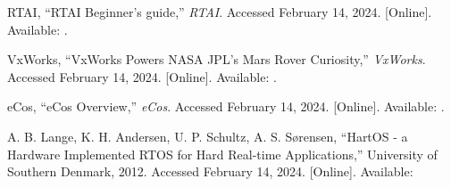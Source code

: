 \begin{thebibliography}{99}
        RTAI,
        ``RTAI Beginner's guide,''
        \textit{RTAI}.
        Accessed February 14, 2024.
        [Online].
        Available: .

        VxWorks,
        ``VxWorks Powers NASA JPL's Mars Rover Curiosity,''
        \textit{VxWorks}.
        Accessed February 14, 2024.
        [Online].
        Available: .

        eCos,
        ``eCos Overview,''
        \textit{eCos}.
        Accessed February 14, 2024.
        [Online].
        Available: .

        A. B. Lange, K. H. Andersen, U. P. Schultz, A. S. S{\o}rensen,
        ``HartOS - a Hardware Implemented RTOS for Hard Real-time Applications,''
        University of Southern Denmark, 2012.
        Accessed February 14, 2024.
        [Online].
        Available: 

\end{thebibliography}
